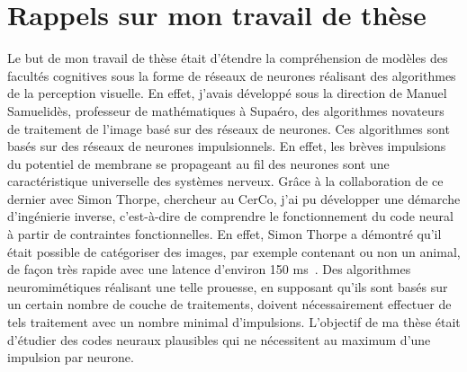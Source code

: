\documentclass[11pt,french,a4paper,oneside]{article}%
\begin{document}
\section{Rappels sur mon travail de thèse}
\label{sec:these}%
Le but de mon travail de thèse était d'étendre la compréhension de modèles des facultés cognitives sous la forme de réseaux de neurones réalisant des algorithmes de la perception visuelle. En effet, j'avais développé sous la direction de Manuel Samuelidès, professeur de mathématiques à {\sc Supaéro}, des algorithmes novateurs de traitement de l'image basé sur des réseaux de neurones. Ces algorithmes sont basés sur des réseaux de neurones impulsionnels. En effet, les brèves impulsions du potentiel de membrane se propageant au fil des neurones sont une caractéristique universelle des systèmes nerveux. %
Grâce à la collaboration de ce dernier avec Simon Thorpe, chercheur au {\sc CerCo}, j'ai pu développer une démarche d'ingénierie inverse, c'est-à-dire de comprendre le fonctionnement du code neural à partir de contraintes fonctionnelles. En effet, Simon Thorpe a démontré qu'il était possible de catégoriser des images, par exemple contenant ou non un animal, de façon très rapide avec une latence d'environ 150 ms~\citep{Thorpe96}. Des algorithmes neuromimétiques réalisant une telle prouesse, en supposant qu'ils sont basés sur un certain nombre de couche de traitements, doivent nécessairement effectuer de tels traitement avec un nombre minimal d'impulsions. L'objectif de ma thèse était d'étudier des codes neuraux plausibles qui ne nécessitent au maximum d'une impulsion par neurone. %
\end{document}
